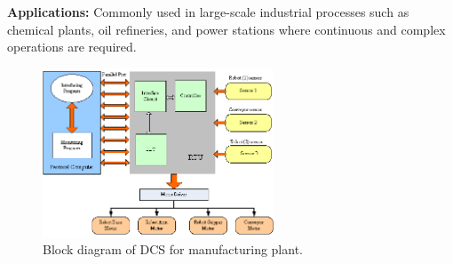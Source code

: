 \textbf{Applications:} Commonly used in large-scale industrial processes
such as chemical plants, oil refineries, and power stations where
continuous and complex operations are required.




\begin{figure}[h!]
  \centering
  \includegraphics[width=2.704in,height=1.97862in]{figs/control_instrumentation/image11.png}
  \caption{Block diagram of DCS for manufacturing plant.}
  \label{fig:Block diagram of DCS}
\end{figure}
